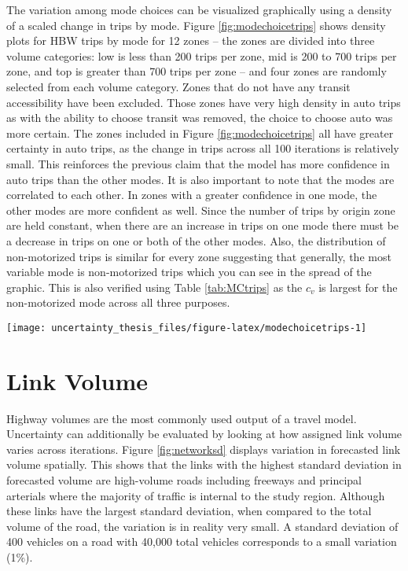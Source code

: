 \documentclass[fancy, masters]{byuthesis}
\begin{document}
The variation among mode choices can be visualized graphically using a density of a scaled change in trips by mode. Figure \ref{fig:modechoicetrips} shows density plots for HBW trips by mode for 12 zones -- the zones are divided into three volume categories: low is less than 200 trips per zone, mid is 200 to 700 trips per zone, and top is greater than 700 trips per zone -- and four zones are randomly selected from each volume category. Zones that do not have any transit accessibility have been excluded. Those zones have very high density in auto trips as with the ability to choose transit was removed, the choice to choose auto was more certain. The zones included in Figure \ref{fig:modechoicetrips} all have greater certainty in auto trips, as the change in trips across all 100 iterations is relatively small. This reinforces the previous claim that the model has more confidence in auto trips than the other modes. It is also important to note that the modes are correlated to each other. In zones with a greater confidence in one mode, the other modes are more confident as well. Since the number of trips by origin zone are held constant, when there are an increase in trips on one mode there must be a decrease in trips on one or both of the other modes. Also, the distribution of non-motorized trips is similar for every zone suggesting that generally, the most variable mode is non-motorized trips which you can see in the spread of the graphic. This is also verified using Table \ref{tab:MCtrips} as the \(c_v\) is largest for the non-motorized mode across all three purposes.

\begin{sidewaysfigure}

{\centering \texttt{[image: uncertainty\_thesis\_files/figure-latex/modechoicetrips-1]} 

}

\caption{Trip density for coefficient of variation by mode for HBW trips.}\label{fig:modechoicetrips}
\end{sidewaysfigure}

\hypertarget{link-volume}{%
\section{Link Volume}\label{link-volume}}

Highway volumes are the most commonly used output of a travel model. Uncertainty can additionally be evaluated by looking at how assigned link volume varies across iterations. Figure \ref{fig:networksd} displays variation in forecasted link volume spatially. This shows that the links with the highest standard deviation in forecasted volume are high-volume roads including freeways and principal arterials where the majority of traffic is internal to the study region. Although these links have the largest standard deviation, when compared to the total volume of the road, the variation is in reality very small. A standard deviation of 400 vehicles on a road with 40,000 total vehicles corresponds to a small variation (1\%).
\end{document}

